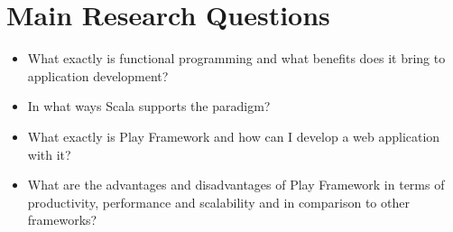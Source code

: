 \documentclass[12pt,twoside,a4paper]{report}
\begin{document}
\section{Main Research Questions}\label{1.3}
\begin{itemize}\itemsep1pt \parskip0pt 
\item What exactly is functional programming and what benefits does it bring to application development?
\item In what ways Scala supports the paradigm?
\item What exactly is Play Framework and how can I develop a web application with it?
\item What are the advantages and disadvantages of Play Framework in terms of productivity, performance and scalability and in comparison to other frameworks?
\end{itemize}

\end{document}
